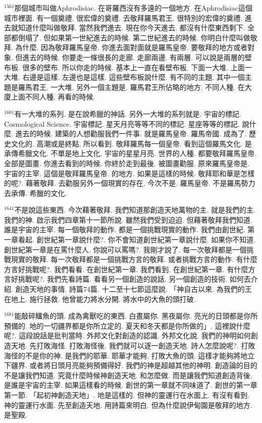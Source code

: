 \documentclass{book}
\begin{document}
$^{1561}$那個城市叫做Aphrodisiac.
在哥羅西沒有多遠的一個地方.
在Aphrodisiac這個城市裡面.
有一個奠禮.
很宏偉的奠禮.
去敬拜羅馬君王.
很特別的宏偉的奠禮.
進去就知道什麼叫做敬拜.
當然我們進去.
現在你今天進去.
都沒有什麼東西剩下.
全部都倒塌了.
但如果第一世紀進去的時候.
第二世紀進去的時候.
你明白什麼叫做敬拜.
為什麼.
因為敬拜羅馬皇帝.
你進去面對面就是羅馬皇帝.
要敬拜的地方或者對象.
但進去的時候.
你要走一條很長的走廊.
走廊兩邊.
有兩層.
可以說是兩層的壁布板.
很多的壁布.
所以你走的時候.
基本上一直在看壁布板.
下面一大堆.
上面一大堆.
右邊是這樣.
左邊也是這樣.
這些壁布板說什麼.
有不同的主題.
其中一個主題是羅馬君王.
一大堆.
另外一個主題是.
羅馬君王所佔略的地方.
不同人種.
在大廈上面不同人種.
再看的時候.

$^{1601}$有一大堆的系列.
是在說希臘的神話.
另外一大堆的系列就是.
宇宙的標記.
Cosmological Science.
宇宙標記.
星天月亮等等不同的標記.
星座等等的標記.
說什麼.
進去的時候.
建築的人想勸服我們一件事.
就是羅馬皇帝.
羅馬帝國.
成為了.
歷史文化的.
高潮或是終點.
所以看到.
敬拜羅馬每一個皇帝.
看到這個羅馬文化.
是承傳希臘文化.
不單是地上文化.
宇宙的星星月亮.
世界的人種.
都要敬拜羅馬皇帝.
全部是圖畫.
你進去看到的時候.
你終於走到最後.
被圖畫勸服.
原來羅馬皇帝是.
宇宙的主宰.
這個是敬拜羅馬皇帝.
的地方.
如果是這樣的時候.
敬拜耶和華是怎樣的呢?.
藉著敬拜.
去勸服另外一個現實的存在.
今次不是.
羅馬皇帝.
不是羅馬勢力去承傳.
希臘的文化.

$^{1641}$不是說這些東西.
今次藉著敬拜.
我們知道那創造天地萬物的主.
就是我們的主.
我們的神.
啟示我們四章第十一節所說.
雖然我們受到迫迫.
但藉著敬拜我們知道.
誰是宇宙的主宰.
每一個敬拜的動作.
都是一個挑戰現實的動作.
我們由創世紀.
第一章看起.
創世紀第一章說什麼?.
你不會知道創世紀第一章說什麼.
如果你不知道.
創世紀第一章是在罵什麼人.
你說可以罵嗎?.
我剛才說了.
每一次敬拜都是一個挑戰現實的敬拜.
每一次敬拜都是一個挑戰方言的敬拜.
或者挑戰方言的動作.
有什麼方言好挑戰呢?.
我們看看.
在創世紀第一章.
我們看到.
在創世紀第一章.
有什麼方言好挑戰呢?.
我們先看詩篇.
看看另一個創造的說話.
另一個創造的技術.
如何去介紹.
創造天地的事情.
詩篇74篇.
十二至十七節這麼說.
「神自古以來.
為我們的王在地上.
施行拯救.
他曾能力將水分開.
將水中的大魚的頭打破.

$^{1681}$能敲碎鱷魚的頭.
成為禽獸吃的東西.
白晝屬你.
黑夜屬你.
亮光的日頭都是你所預備的.
地的一切疆界都是你所立定的.
夏天和冬天都是你所做的」.
這裡說什麼呢?.
這段說話是批判當時.
外邦文化對創造的認識.
外邦文化說.
我們的神明如何創造天地.
先打敗海怪.
打敗海怪後.
我們就可以逐一創造天地.
詩人怎麼說呢?.
打敗海怪的不是你的神.
是我們的耶華.
耶華才能夠.
打敗大魚的頭.
這樣才能夠將地立下疆界.
或者將日頭月亮能夠預備得好.
我們的神是超越其他的神明.
創造論的目的不是讓我們知道.
究竟什麼時候神創造天地.
和怎麼做.
而是讓我們知道創造背後.
是誰是宇宙的主宰.
如果這樣看的時候.
創世的第一章就不同味道了.
創世的第一章第一節.
「起初神創造天地」.
地是這樣的.
但神的靈運行在水面上.
有沒有看到.
神的靈運行水面.
先至創造天地.
用詩篇來明白.
但為什麼說伊甸園是敬拜的地方.
是聖殿.
\end{document}

